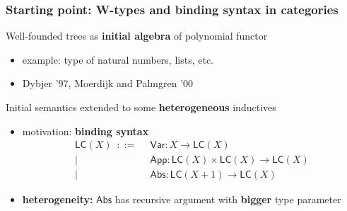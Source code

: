 \documentclass[
serif,
mathsans,
]
{beamer}
\newcommand{\constfont}[1]{\ensuremath{\mathsf{#1}}}
\newcommand{\App}{\constfont{App}}
\newcommand{\Abs}{\constfont{Abs}}
\newcommand{\Var}{\constfont{Var}}
\newcommand{\LC}{\mathsf{LC}}
\newcommand{\fat}[1]{\textbf{#1}}
\begin{document}
\begin{frame}
 \frametitle{Starting point: W-types and binding syntax in categories}
 
 \begin{block}{Well-founded trees as \fat{initial algebra} of polynomial functor}
  \begin{itemize}
   \item example: type of natural numbers, lists, etc.
   \item Dybjer '97, Moerdijk and Palmgren '00
  \end{itemize}
 \end{block}

 \begin{block}{Initial semantics extended to some \fat{heterogeneous} inductives}
 
  \begin{itemize}
    \item motivation: \fat{binding syntax} 
           \begin{align*} \LC(X) \enspace ::=                                              
                                           \enspace  & \Var : X \to \LC(X) \\
                                           | \enspace  & \App : \LC(X)\times\LC(X)\to\LC(X) \\ 
                                           | \enspace &\Abs : \LC(X + 1) \to \LC(X) \enspace
           \end{align*}
    \item \fat{heterogeneity:} $\Abs$ has recursive argument with \fat{bigger} type parameter
  \end{itemize}
 \end{block} 
\end{frame}
\end{document}
